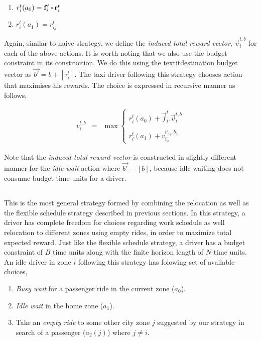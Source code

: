 \begin{enumerate}
    \item $r_{i}^{t}(a_0) = \vec{f}_{i}^{t} \bigcdot \vec{r}_{i}^{t}$ \\
    \item $r_{i}^{t}(a_1) = r_{ij}^{t}$
\end{enumerate}

Again, similar to naive strategy, we define the \textit{induced total reward vector}, $\vec{v}_i^{t,b}$ for each of the above actions. It is worth noting that we also use the budget constraint in its construction. We do this using the textit{destination budget vector} as $\vec{b'} = b + [\tau_{i}^{t}]$. The taxi driver following this strategy chooses action that maximises his rewards. The choice is expressed in recursive manner as follows,

\begin{eqnarray}
v_{i}^{t,b} &=& \max
    \begin{cases}
    r_{i}^{t}(a_0) + \vec{f}_{i}^{t}.\vec{v}_{i}^{t,b} \\ \\
    r_{i}^{t}(a_1) + v_{i_0}^{t'_{i_0},b_{i_0}}
    \end{cases}
\end{eqnarray}

Note that the \textit{induced total reward vector} is constructed in slightly different manner for the \textit{idle wait} action where $\vec{b'} = [b]$, because idle waiting does not consume budget time units for a driver.

\subsection{\relocationflexible}

This is the most general strategy formed by combining the relocation as well as the flexible schedule strategy described in previous sections. In this strategy, a driver has complete freedom for choices regarding work schedule as well relocation to different zones using empty rides, in order to maximize total expected reward. Just like the flexible schedule strategy, a driver has a budget constraint of $B$ time units along with the finite horizon length of $N$ time units. An idle driver in zone $i$ following this strategy has folowing set of available choices,

\begin{enumerate}
    \item \textit{Busy wait} for a passenger ride in the current zone ($a_0$).
    \item \textit{Idle wait} in the home zone ($a_1$).
    \item Take an \textit{empty ride} to some other city zone $j$ suggested by our strategy in search of a passenger ($a_2(j)$) where $j \neq i$. \\
\end{enumerate}

